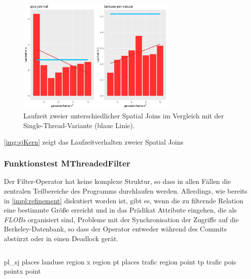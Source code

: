 \documentclass[a4paper,12pt,twoside]{article}
\newcommand{\Fb}[1]{\textit{#1}} %
\begin{document}
\begin{figure}
	\centering
	\includegraphics[width=0.70\textwidth]{Bilder/sj_kerne.png}
	\caption{Laufzeit zweier unterschiedlicher Spatial Joins im Vergleich mit der Single-Thread-Variante (blaue Linie).}
	\label{img:sjKern}
\end{figure}

\autoref{img:sjKern} zeigt das Laufzeitverhalten zweier Spatial Joins


\subsubsection{Funktionstest MThreadedFilter}

Der Filter-Operator hat keine komplexe Struktur, so dass in allen Fällen die zentralen Teilbereiche des Programms durchlaufen werden. Allerdings, wie bereits in \autoref{impl:refinement} diskutiert worden ist, gibt es, wenn die zu filternde Relation eine bestimmte Größe erreicht und in das Prädikat Attribute eingehen, die als \Fb{FLOBs} organisiert sind, Probleme mit der Synchronisation der Zugriffe auf die Berkeley-Datenbank, so dass der Operator entweder während des Commits abstürzt oder in einen Deadlock gerät.

\begin{minipage}{\linewidth}
	\begin{lstlisting}[caption={Beispiel Testqueries für den Filter-Operator}, label=list:testfilter]

	\end{lstlisting}
\end{minipage}

pl\_sj places landuse region x region
pt places trafic region point
tp trafic pois pointx point
\end{document}
